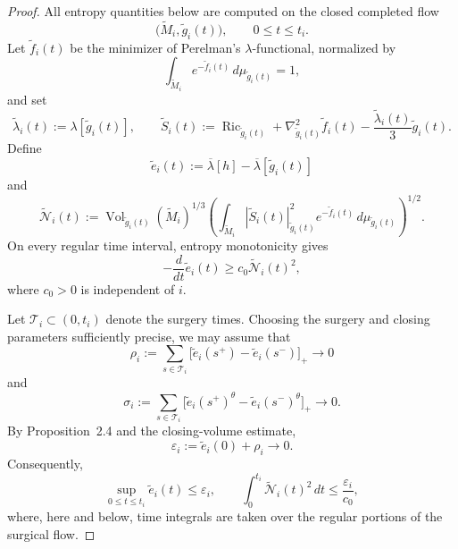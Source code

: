\documentclass[10pt,a4paper]{amsart}
\begin{document}
\begin{proof}
\noindent
All entropy quantities below are computed on the closed completed flow
\[
        \bigl(\widetilde M_i,\widetilde g_i(t)\bigr),
        \qquad 0\leq t\leq t_i .
\]
Let \(\widetilde f_i(t)\) be the minimizer of Perelman's
\(\lambda\)-functional, normalized by
\[
        \int_{\widetilde M_i}
        e^{-\widetilde f_i(t)}
        \,d\mu_{\widetilde g_i(t)}
        =1,
\]
and set
\[
        \widetilde\lambda_i(t)
        :=
        \lambda[\widetilde g_i(t)],
        \qquad
        \widetilde S_i(t)
        :=
        \operatorname{Ric}_{\widetilde g_i(t)}
        +
        \nabla_{\widetilde g_i(t)}^{2}\widetilde f_i(t)
        -
        \frac{\widetilde\lambda_i(t)}{3}
        \widetilde g_i(t).
\]
Define
\[
        \widetilde e_i(t)
        :=
        \overline\lambda[h]
        -
        \overline\lambda[\widetilde g_i(t)]
\]
and
\[
        \widetilde{\mathcal N}_i(t)
        :=
        \operatorname{Vol}_{\widetilde g_i(t)}
        (\widetilde M_i)^{1/3}
        \left(
        \int_{\widetilde M_i}
        |\widetilde S_i(t)|_{\widetilde g_i(t)}^{2}
        e^{-\widetilde f_i(t)}
        \,d\mu_{\widetilde g_i(t)}
        \right)^{1/2}.
\]
On every regular time interval, entropy monotonicity gives
\begin{equation}
\label{eq:closed-entropy-dissipation}
        -\frac{d}{dt}\widetilde e_i(t)
        \geq
        c_0\widetilde{\mathcal N}_i(t)^2,
\end{equation}
where \(c_0>0\) is independent of \(i\).

\noindent Let \(\mathcal T_i\subset(0,t_i)\) denote the surgery times.  Choosing
the surgery and closing parameters sufficiently precise, we may assume
that
\[
        \rho_i
        :=
        \sum_{s\in\mathcal T_i}
        \bigl[
        \widetilde e_i(s^+)-\widetilde e_i(s^-)
        \bigr]_+
        \longrightarrow0
\]
and
\[
        \sigma_i
        :=
        \sum_{s\in\mathcal T_i}
        \bigl[
        \widetilde e_i(s^+)^\theta
        -
        \widetilde e_i(s^-)^\theta
        \bigr]_+
        \longrightarrow0.
\]
By Proposition~2.4 and the closing-volume estimate,
\[
        \varepsilon_i
        :=
        \widetilde e_i(0)+\rho_i
        \longrightarrow0.
\]
Consequently,
\begin{equation}
\label{eq:closed-entropy-budget}
        \sup_{0\leq t\leq t_i}\widetilde e_i(t)
        \leq\varepsilon_i,
        \qquad
        \int_0^{t_i}
        \widetilde{\mathcal N}_i(t)^2\,dt
        \leq
        \frac{\varepsilon_i}{c_0},
\end{equation}
where, here and below, time integrals are taken over the regular
portions of the surgical flow.


\end{proof}
\end{document}
